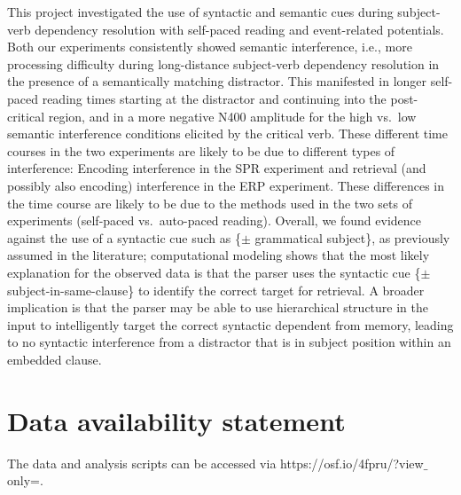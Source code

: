 \documentclass[a4paper, man, floatsintext]{apa7}
\begin{document}
This project investigated the use of  syntactic and semantic cues during subject-verb dependency resolution with self-paced reading and event-related potentials.  Both our experiments consistently showed semantic interference, i.e., more processing difficulty during long-distance subject-verb dependency resolution in the presence of a semantically matching distractor. This manifested in longer self-paced reading times starting at the distractor and continuing into the post-critical region, and in a more negative N400 amplitude for the high vs.\ low semantic interference conditions elicited by the critical verb. These different time courses in the two experiments are likely to be due to different types of interference: Encoding interference in the SPR experiment and retrieval (and possibly also encoding) interference in the ERP experiment. These differences in the time course are likely to be due to the methods used in the two sets of experiments (self-paced vs.\ auto-paced reading). Overall, we found evidence against the use of a syntactic cue such as \{$\pm$ grammatical subject\}, as previously assumed in the literature; computational modeling shows that the most likely explanation for the observed data is that the parser uses the syntactic cue  \{$\pm$ subject-in-same-clause\}  to identify the correct target for retrieval.  A broader implication is that the parser may be able to use hierarchical structure in the input to intelligently target the correct syntactic dependent from memory, leading to no syntactic interference from a distractor that is in subject position within an embedded clause.

\section{Data availability statement}

The data and analysis scripts can be accessed via https://osf.io/4fpru/?view$\_$only=.


\newpage
\printbibliography


\end{document}
